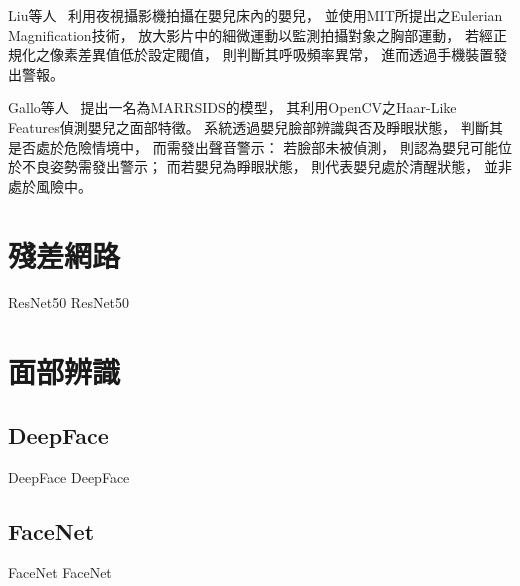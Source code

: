 \documentclass[class=NCU_thesis, crop=false]{standalone}
\begin{document}
Liu等人~\cite{liuVideoBasedIoTBabyMonitorForSIDSPrevention2017}
利用夜視攝影機拍攝在嬰兒床內的嬰兒，
並使用MIT所提出之Eulerian Magnification技術，
放大影片中的細微運動以監測拍攝對象之胸部運動，
若經正規化之像素差異值低於設定閥值，
則判斷其呼吸頻率異常，
進而透過手機裝置發出警報。

Gallo等人~\cite{galloMARRSIDS2019}
提出一名為MARRSIDS的模型，
其利用OpenCV之Haar-Like Features偵測嬰兒之面部特徵。
系統透過嬰兒臉部辨識與否及睜眼狀態，
判斷其是否處於危險情境中，
而需發出聲音警示：
若臉部未被偵測，
則認為嬰兒可能位於不良姿勢需發出警示；
而若嬰兒為睜眼狀態，
則代表嬰兒處於清醒狀態，
並非處於風險中。





\section{殘差網路}
ResNet50 ResNet50

\section{面部辨識}
\subsection{DeepFace}
DeepFace DeepFace

\subsection{FaceNet}
FaceNet FaceNet
\end{document}
